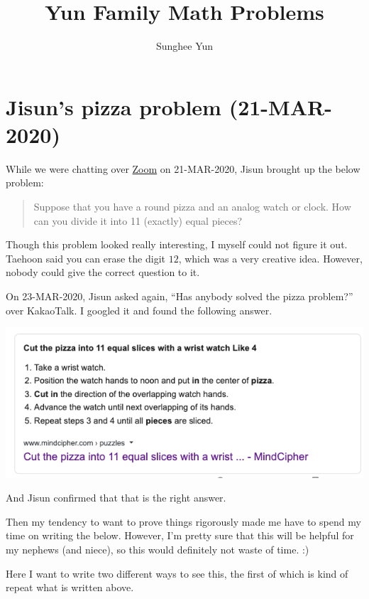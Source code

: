 \documentclass{article}
\title{Yun Family Math Problems}
\author{Sunghee Yun}
\begin{document}
\maketitle

\section{Jisun's pizza problem (21-MAR-2020)}

While we were chatting over \href{https://zoom.us/}{Zoom} on 21-MAR-2020,
Jisun brought up the below problem:
\begin{quote}
Suppose that you have a round pizza and an analog watch or clock.
How can you divide it into 11 (exactly) equal pieces?
\end{quote}
Though this problem looked really interesting,
I myself could not figure it out.
Taehoon said you can erase the digit $12$,
which was a very creative idea.
However, nobody could give the correct question to it.

On 23-MAR-2020, Jisun asked again, ``Has anybody solved the pizza problem?'' over KakaoTalk.
I googled it and found the following answer.

\begin{center}
\includegraphics[width=.7\linewidth]{figures/pizze_cut_prob_answer_by_googling}
\end{center}

And Jisun confirmed that that is the right answer.

Then my tendency to want to prove things rigorously
made me have to spend my time on writing the below.
However, I'm pretty sure that this will be helpful for my nephews (and niece),
so this would definitely not waste of time. :) 


Here I want to write two different ways to see this, the first of which is kind of repeat what is written above.
\end{document}
